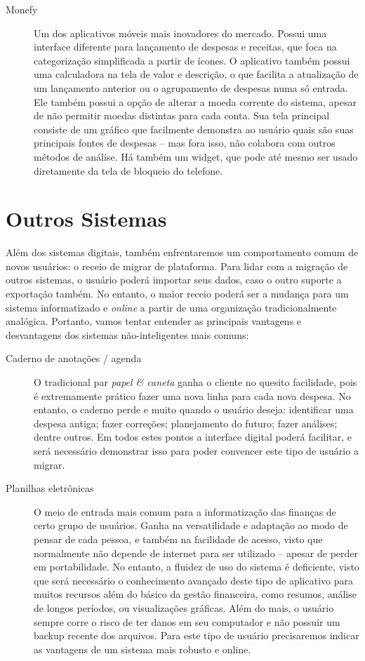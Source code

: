 \documentclass[a4paper]{abnt}
\begin{document}
\begin{description}
	\item[Monefy] Um dos aplicativos móveis mais inovadores do mercado. Possui uma interface diferente para lançamento de despesas e receitas, que foca na categorizaç\~ao simplificada a partir de ícones. O aplicativo também possui uma calculadora na tela de valor e descriç\~ao, o que facilita a atualizaç\~ao de um lançamento anterior ou o agrupamento de despesas numa só entrada. Ele também possui a opç\~ao de alterar a moeda corrente do sistema, apesar de n\~ao permitir moedas distintas para cada conta. Sua tela principal consiste de um gráfico que facilmente demonstra ao usuário quais s\~ao suas principais fontes de despesas -- mas fora isso, n\~ao colabora com outros métodos de análise. Há também um widget, que pode até mesmo ser usado diretamente da tela de bloqueio do telefone.
\end{description}

\section{Outros Sistemas}
Além dos sistemas digitais, também enfrentaremos um comportamento comum de novos usuários: o receio de migrar de plataforma. Para lidar com a migraç\~ao de outros sistemas, o usuário poderá importar seus dados, caso o outro suporte a exportaç\~ao também. No entanto, o maior receio poderá ser a mudança para um sistema informatizado e \emph{online} a partir de uma organizaç\~ao tradicionalmente analógica. Portanto, vamos tentar entender as principais vantagens e desvantagens dos sistemas n\~ao-inteligentes mais comuns:

\begin{description}
	\item[Caderno de anotaç\~oes / agenda] O tradicional par \emph{papel \& caneta} ganha o cliente no quesito facilidade, pois é extremamente prático fazer uma nova linha para cada nova despesa. No entanto, o caderno perde e muito quando o usuário deseja: identificar uma despesa antiga; fazer correç\~oes; planejamento do futuro; fazer análises; dentre outros. Em todos estes pontos a interface digital poderá facilitar, e será necessário demonstrar isso para poder convencer este tipo de usuário a migrar.
	
	\item[Planilhas eletrônicas] O meio de entrada mais comum para a informatizaç\~ao das finanças de certo grupo de usuários. Ganha na versatilidade e adaptaç\~ao ao modo de pensar de cada pessoa, e também na facilidade de acesso, visto que normalmente n\~ao depende de internet para ser utilizado -- apesar de perder em portabilidade. No entanto, a fluidez de uso do sistema é deficiente, visto que será necessário o conhecimento avançado deste tipo de aplicativo para muitos recursos além do básico da gest\~ao financeira, como resumos, análise de longos períodos, ou visualizaç\~oes gráficas. Além do mais, o usuário sempre corre o risco de ter danos em seu computador e n\~ao possuir um backup recente dos arquivos. Para este tipo de usuário precisaremos indicar as vantagens de um sistema mais robusto e online.
\end{description}
\end{document}
